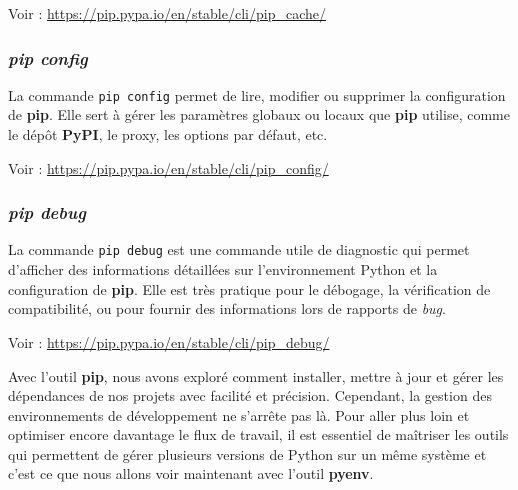 Voir : \url{https://pip.pypa.io/en/stable/cli/pip_cache/}

\subsubsection*{\textit{pip config}}
La commande \texttt{pip config} permet de lire, modifier ou supprimer la configuration de \textbf{pip}. Elle sert à gérer les paramètres globaux ou locaux que \textbf{pip} utilise, comme le dépôt \textbf{PyPI}, le proxy, les options par défaut, etc.

Voir : \url{https://pip.pypa.io/en/stable/cli/pip_config/}

\subsubsection*{\textit{pip debug}}
La commande \texttt{pip debug} est une commande utile de diagnostic qui permet d’afficher des informations détaillées sur l’environnement Python et la configuration de \textbf{pip}. Elle est très pratique pour le débogage, la vérification de compatibilité, ou pour fournir des informations lors de rapports de \textit{bug}.

Voir : \url{https://pip.pypa.io/en/stable/cli/pip_debug/}

\bigskip 

\begin{center}
\end{center}

Avec l'outil \textbf{pip}, nous avons exploré comment installer, mettre à jour et gérer les dépendances de nos projets avec facilité et précision. Cependant, la gestion des environnements de développement ne s'arrête pas là. Pour aller plus loin et optimiser encore davantage le flux de travail, il est essentiel de maîtriser les outils qui permettent de gérer plusieurs versions de Python sur un même système et c'est ce que nous allons voir maintenant avec l'outil \textbf{pyenv}.
